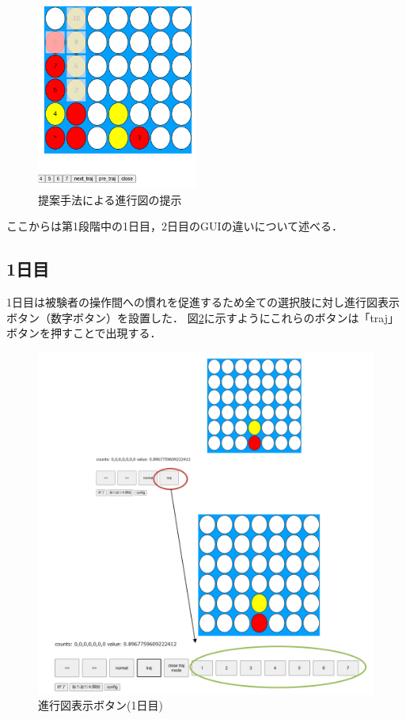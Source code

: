 \begin{figure}[t]
	\centering
	\includegraphics[width=150pt]{./figure/multi.png}
	\caption{提案手法による進行図の提示}
	\label{fig:multi}
\end{figure}
ここからは第1段階中の1日目，2日目のGUIの違いについて述べる．
\subsection{1日目}
1日目は被験者の操作間への慣れを促進するため全ての選択肢に対し進行図表示ボタン（数字ボタン）を設置した．
図\ref{fig:traj-button}に示すようにこれらのボタンは「traj」ボタンを押すことで出現する．
\begin{figure}[t]
	\centering
	\includegraphics[width=\linewidth]{./figure/traj-button.png}
	\caption{進行図表示ボタン(1日目)}
	\label{fig:traj-button}
\end{figure}
